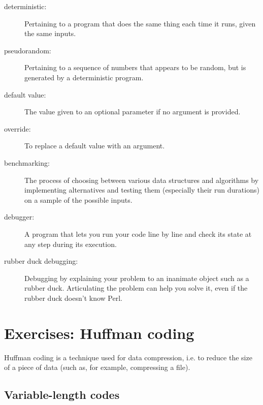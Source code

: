 \begin{description}

\item[deterministic:] Pertaining to a program that does the same
thing each time it runs, given the same inputs.

\item[pseudorandom:] Pertaining to a sequence of numbers that appears
to be random, but is generated by a deterministic program.

\item[default value:] The value given to an optional parameter if no
argument is provided.

\item[override:] To replace a default value with an argument.

\item[benchmarking:] The process of choosing between various data 
structures and algorithms by implementing alternatives and testing 
them (especially their run durations) on a sample of the possible inputs.  

\item[debugger:] A program that lets you run your code line by 
line and check its state at any step during its execution.

\item[rubber duck debugging:] Debugging by explaining your problem
to an inanimate object such as a rubber duck.  Articulating the
problem can help you solve it, even if the rubber duck 
doesn't know Perl. 

\end{description}



\section{Exercises: Huffman coding}
\label{huffman_exercise}

Huffman coding is a technique used for data compression, i.e. 
to reduce the size of a piece of data (such as, for example, 
compressing a file).

\subsection{Variable-length codes}

